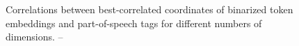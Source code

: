 \begin{figure}
\caption{Correlations between best-correlated coordinates of binarized
         token embeddings and part-of-speech tags for different
         numbers of dimensions. -- \textcite[Figure 3.3]{stefanik2019semantic}}
\end{figure}
